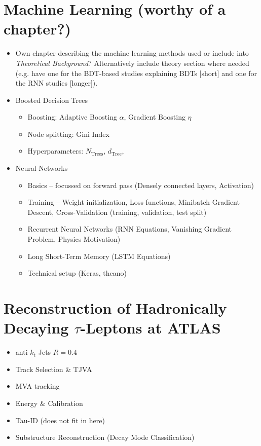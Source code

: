 \section{Machine Learning (worthy of a chapter?)}

\begin{itemize}
\item Own chapter describing the machine learning methods used or include into
  \textit{Theoretical Background}? Alternatively include theory section where
  needed (e.g. have one for the BDT-based studies explaining BDTs [short] and
  one for the RNN studies [longer]).

\item Boosted Decision Trees
  \begin{itemize}
  \item Boosting: Adaptive Boosting $\alpha$, Gradient Boosting $\eta$
  \item Node splitting: Gini Index
  \item Hyperparameters: $N_\mathrm{Trees}$, $d_\mathrm{Tree}$,
  \end{itemize}

\item Neural Networks
  \begin{itemize}
  \item Basics -- focussed on forward pass (Densely connected layers, Activation)
  \item Training -- Weight initialization, Loss functions, Minibatch Gradient
    Descent, Cross-Validation (training, validation, test split)
  \item Recurrent Neural Networks (RNN Equations, Vanishing Gradient Problem,
    Physics Motivation)
  \item Long Short-Term Memory \cite{lstm} (LSTM Equations)
  \item Technical setup (Keras, theano)
  \end{itemize}
\end{itemize}

\section{Reconstruction of Hadronically Decaying $\tau$-Leptons at ATLAS}

\begin{itemize}
\item anti-$k_\mathrm{t}$ Jets $R = 0.4$
\item Track Selection \& TJVA
\item MVA tracking
\item Energy \& Calibration
\item Tau-ID (does not fit in here)
\item Substructure Reconstruction (Decay Mode Classification)
\end{itemize}


